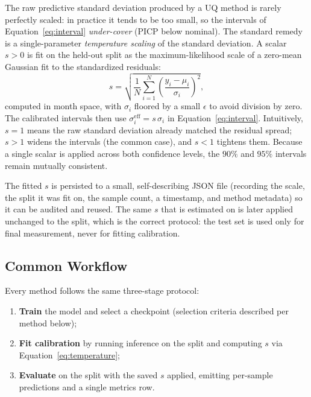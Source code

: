 The raw predictive standard deviation produced by a UQ method is rarely
perfectly scaled: in practice it tends to be too small, so the intervals of
Equation~\eqref{eq:interval} \emph{under-cover} (PICP below nominal). The
standard remedy is a single-parameter \emph{temperature scaling} of the
standard deviation. A scalar $s>0$ is fit on the held-out  split as
the maximum-likelihood scale of a zero-mean Gaussian fit to the standardized
residuals:
\begin{equation}
  s = \sqrt{\frac{1}{N}\sum_{i=1}^{N}\left(\frac{y_i - \mu_i}{\sigma_i}\right)^{2}},
  \label{eq:temperature}
\end{equation}
computed in month space, with $\sigma_i$ floored by a small $\epsilon$ to avoid
division by zero. The calibrated intervals then use $\sigma_i^{\text{eff}} = s\,
\sigma_i$ in Equation~\eqref{eq:interval}. Intuitively, $s=1$ means the raw
standard deviation already matched the residual spread; $s>1$ widens the
intervals (the common case), and $s<1$ tightens them. Because a single scalar is
applied across both confidence levels, the $90\%$ and $95\%$ intervals remain
mutually consistent.

The fitted $s$ is persisted to a small, self-describing JSON file (recording
the scale, the split it was fit on, the sample count, a timestamp, and method
metadata) so it can be audited and reused. The same $s$ that is estimated on
 is later applied unchanged to the  split, which is the
correct protocol: the test set is used only for final measurement, never for
fitting calibration.

\subsection{Common Workflow}

Every method follows the same three-stage protocol:
\begin{enumerate}
  \item \textbf{Train} the model and select a checkpoint (selection criteria
  described per method below);
  \item \textbf{Fit calibration} by running inference on the  split
  and computing $s$ via Equation~\eqref{eq:temperature};
  \item \textbf{Evaluate} on the  split with the saved $s$ applied,
  emitting per-sample predictions and a single metrics row.
\end{enumerate}

